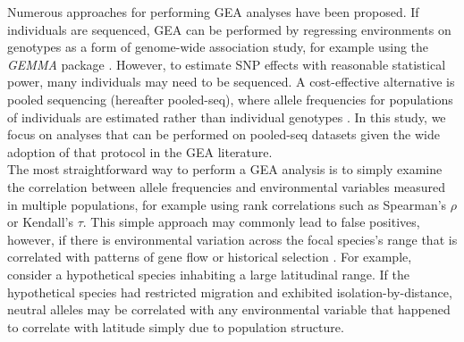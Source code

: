 \documentclass[10pt,twoside,lineno, twocolumn]{GSA_format}
\begin{document}
Numerous approaches for performing GEA analyses have been proposed. If individuals are sequenced, GEA can be performed by regressing environments on genotypes as a form of genome-wide association study, for example using the \textit{GEMMA} package \citep{Zhou2013}. However, to estimate SNP effects with reasonable statistical power, many individuals may need to be sequenced. A cost-effective alternative is pooled sequencing (hereafter pooled-seq), where allele frequencies for populations of individuals are estimated rather than individual genotypes \citep{Schlotterer2014}. In this study, we focus on analyses that can be performed on pooled-seq datasets given the wide adoption of that protocol in the GEA literature.\\

The most straightforward way to perform a GEA analysis is to simply examine the correlation between allele frequencies and environmental variables measured in multiple populations, for example using rank correlations such as Spearman's $\rho$ or Kendall's $\tau$. This simple approach may commonly lead to false positives, however, if there is environmental variation across the focal species's range that is correlated with patterns of gene flow or historical selection \citep{Meirmans2012,Novembre2009}. For example, consider a hypothetical species inhabiting a large latitudinal range. If the hypothetical species had restricted migration and exhibited isolation-by-distance, neutral alleles may be correlated with any environmental variable that happened to correlate with latitude simply due to population structure.  \\

\end{document}
